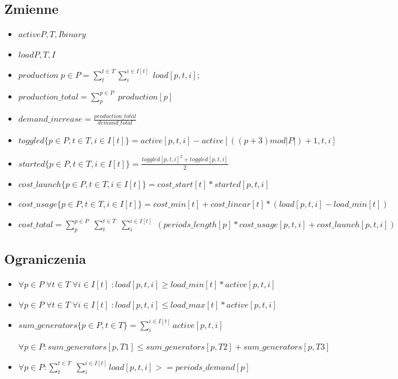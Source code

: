 \documentclass[12pt, twoside, hidelinks, a4paper]{article}
\begin{document}
\subsection{Zmienne}
\begin{itemize}

\item $active{P,T,I} binary$
\item $load{P,T,I}$
\item $production \; {p \in P} = \sum_{t}^{t \in T} \sum_{i}^{i \in I[t]} \; load[p,t,i];$
\item $production\_total = \sum_{p}^{p \in P} \; production[p]$
\item $demand\_increase = \frac{production\_total}{demand\_total}$
\item $toggled \{p \in P, t \in T, i \in I[t] \} = active[p,t,i] - active[((p+3) mod |P|)+1,t,i]$
\item $started \{p \in P, t \in T, i \in I[t] \} = \frac{toggled[p,t,i]^2 + toggled[p,t,i]}{2}$
\item $cost\_launch \{p \in P, t \in T, i \in I[t] \} = cost\_start[t] * started[p,t,i]$
\item $cost\_usage \{p \in P, t \in T, i \in I[t] \} = cost\_min[t] + cost\_linear[t] * (load[p,t,i] - load\_min[t])$
\item $cost\_total = \sum_{p}^{p \in P} \; \sum_{t}^{t \in T} \; \sum_{i}^{i \in I[t]} \; (periods\_length[p] * cost\_usage[p,t,i] + cost\_launch[p,t,i])$
\end{itemize}


\subsection{Ograniczenia}
\begin{itemize}
\item $\forall p \in P \; \forall t \in T \; \forall i \in I[t] \; : load[p,t,i] 
\geqslant load\_min[t] * active[p,t,i]$
\item $\forall p \in P \; \forall t \in T \; \forall i \in I[t] \; : load[p,t,i] \leqslant load\_max[t] * active[p,t,i]$
\item $sum\_generators \{ p \in P, t \in T \} = \sum_{i}^{i \in I[t]} active[p,t,i]$

$\forall p \in P : sum\_generators[p,T1] \leqslant sum\_generators[p,T2] + sum\_generators[p,T3]$
\item $\forall p \in P : \sum_{t}^{t \in T} \; \sum_{i}^{i \in I[t]} load[p,t,i] >= periods\_demand[p]$
\end{itemize}
\end{document}
